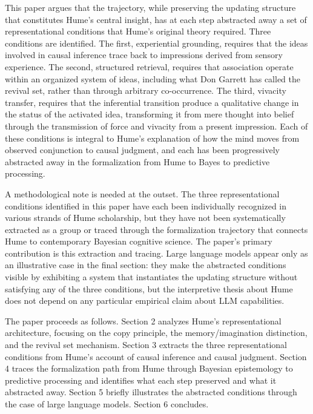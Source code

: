 \documentclass[11pt]{article}
\begin{document}
This paper argues that the trajectory, while preserving the updating structure that constitutes Hume's central insight, has at each step abstracted away a set of representational conditions that Hume's original theory required. Three conditions are identified. The first, experiential grounding, requires that the ideas involved in causal inference trace back to impressions derived from sensory experience. The second, structured retrieval, requires that association operate within an organized system of ideas, including what Don Garrett has called the revival set, rather than through arbitrary co-occurrence. The third, vivacity transfer, requires that the inferential transition produce a qualitative change in the status of the activated idea, transforming it from mere thought into belief through the transmission of force and vivacity from a present impression. Each of these conditions is integral to Hume's explanation of how the mind moves from observed conjunction to causal judgment, and each has been progressively abstracted away in the formalization from Hume to Bayes to predictive processing.

A methodological note is needed at the outset. The three representational conditions identified in this paper have each been individually recognized in various strands of Hume scholarship, but they have not been systematically extracted as a group or traced through the formalization trajectory that connects Hume to contemporary Bayesian cognitive science. The paper's primary contribution is this extraction and tracing. Large language models appear only as an illustrative case in the final section: they make the abstracted conditions visible by exhibiting a system that instantiates the updating structure without satisfying any of the three conditions, but the interpretive thesis about Hume does not depend on any particular empirical claim about LLM capabilities.

The paper proceeds as follows. Section 2 analyzes Hume's representational architecture, focusing on the copy principle, the memory/imagination distinction, and the revival set mechanism. Section 3 extracts the three representational conditions from Hume's account of causal inference and causal judgment. Section 4 traces the formalization path from Hume through Bayesian epistemology to predictive processing and identifies what each step preserved and what it abstracted away. Section 5 briefly illustrates the abstracted conditions through the case of large language models. Section 6 concludes.
\end{document}

